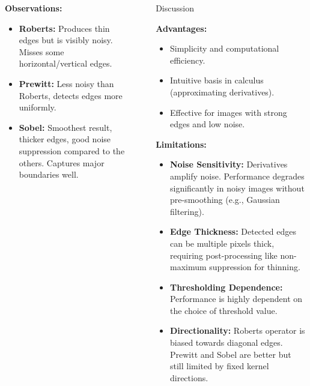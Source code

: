 \documentclass[final]{beamer}
\newlength{\sepwidth}
\newlength{\colwidth}
\newcommand{\separatorcolumn}{\begin{column}{\sepwidth}\end{column}}
\begin{document}
\begin{frame}[t]
\begin{columns}[t]
\begin{column}{\colwidth}
    \textbf{Observations:}
    \begin{itemize}
        \item \textbf{Roberts:} Produces thin edges but is visibly noisy. Misses some horizontal/vertical edges.
        \item \textbf{Prewitt:} Less noisy than Roberts, detects edges more uniformly.
        \item \textbf{Sobel:} Smoothest result, thicker edges, good noise suppression compared to the others. Captures major boundaries well.
    \end{itemize}

   

\end{column} %

\separatorcolumn %

\begin{column}{\colwidth}



\begin{block}{Discussion}
  \begingroup
  \let\oldraggedright\raggedright
  \renewcommand{\raggedright}{\justifying} %
  
    \textbf{Advantages:}
    \begin{itemize}
        \item Simplicity and computational efficiency.
        \item Intuitive basis in calculus (approximating derivatives).
        \item Effective for images with strong edges and low noise.
    \end{itemize}

    \textbf{Limitations:}
    \begin{itemize}
        \item \textbf{Noise Sensitivity:} Derivatives amplify noise. Performance degrades significantly in noisy images without pre-smoothing (e.g., Gaussian filtering).
        \item \textbf{Edge Thickness:} Detected edges can be multiple pixels thick, requiring post-processing like non-maximum suppression for thinning.
        \item \textbf{Thresholding Dependence:} Performance is highly dependent on the choice of threshold value.
        \item \textbf{Directionality:} Roberts operator is biased towards diagonal edges. Prewitt and Sobel are better but still limited by fixed kernel directions.
    \end{itemize}


\end{block}
\end{column}
\end{columns}
\end{frame}
\end{document}

